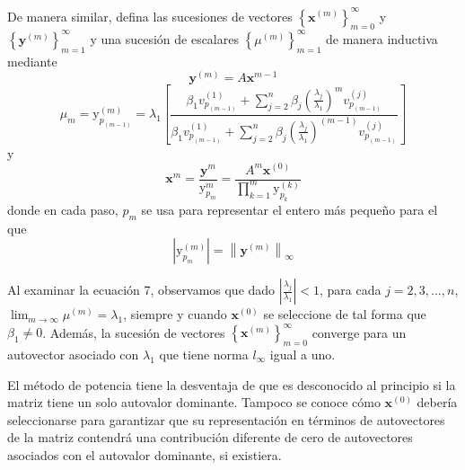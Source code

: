 \documentclass[12pt, a4paper]{article}
\numberwithin{subsection}{section} %
\begin{document}
        De manera similar, defina las sucesiones de vectores $\left\{ \textbf{x}^{\left( m \right)} \right\}_{m = 0}^{\infty }$ y $\left\{ \textbf{y}^{\left( m \right)} \right\}_{m = 1}^{\infty }$ y una sucesión de escalares $\left\{ \mu^{\left( m \right)} \right\}_{m = 1}^{\infty }$ de manera inductiva mediante
        \begin{equation*}
        \textbf{y}^{\left( m \right)} = A \textbf{x}^{m-1}
        \end{equation*}
        \begin{equation}
        \mu_{m} = \text{y}_{p_{\left( m-1 \right)}}^{\left( m \right)} = \lambda_{1} \left[ \frac{\beta_{1} v_{p_{\left( m-1 \right)}}^{\left( 1 \right)} + \sum_{j = 2}^{n} \beta_{j} \left( \frac{\lambda_{j}}{\lambda_{1}} \right)^{m} v_{p_{\left( m-1 \right)}}^{\left( j \right)}}{\beta_{1}  v_{p_{\left( m-1 \right)}}^{\left( 1 \right)} + \sum_{j = 2}^{n} \beta_{j} \left( \frac{\lambda_{j}}{\lambda_{1}} \right)^{\left( m-1 \right)} v_{p_{\left( m-1 \right)}}^{\left( j \right)}} \right]
        \end{equation}
        y
        \begin{equation*}
        \textbf{x}^{m} = \frac{\textbf{y}^{m}}{\text{y}_{p_{m}}^{m}} = \frac{A^{m}\textbf{x}^{\left( 0 \right)}}{\prod_{k=1}^{m}\text{y}_{p_{k}}^{\left( k \right)}}
        \end{equation*}
        donde en cada paso, $p_{m}$ se usa para representar el entero más pequeño para el que
        \begin{equation*}
        \left| \text{y}_{p_{m}}^{\left( m \right)} \right| = \left\| \textbf{y}^{\left( m \right)} \right\|_{\infty }
        \end{equation*}
        
        Al examinar la ecuación 7, observamos que dado $\left| \frac{\lambda_{j}}{\lambda_{1}} \right| < 1$, para cada $j = 2, 3, ..., n$, $\lim_{m \to \infty } \mu^{\left( m \right)} = \lambda_{1}$, siempre y cuando $\textbf{x}^{\left( 0 \right)}$ se seleccione de tal forma que $\beta_{1} \neq 0$. Además, la sucesión de vectores $\left\{ \textbf{x}^{\left( m \right)} \right\}_{m = 0}^{\infty }$ converge para un autovector asociado con $\lambda_{1}$ que tiene norma $l_{\infty}$ igual a uno.
        
        El método de potencia tiene la desventaja de que es desconocido al principio si la matriz tiene un solo autovalor dominante. Tampoco se conoce cómo $\textbf{x}^{\left( 0 \right)}$ debería seleccionarse para garantizar que su representación en términos de autovectores de la matriz contendrá una contribución diferente de cero de autovectores asociados con el autovalor dominante, si existiera.
        
\end{document}
